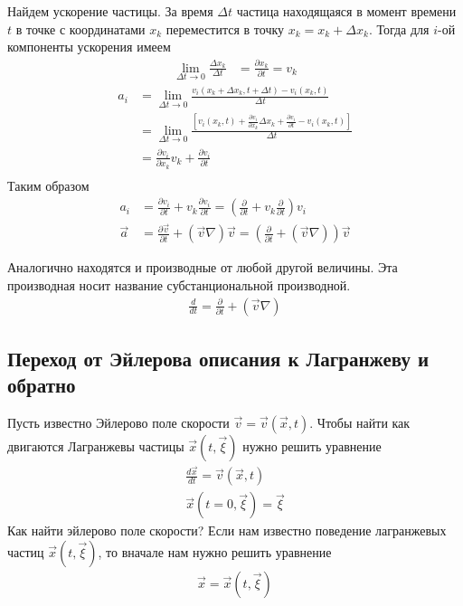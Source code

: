 Найдем ускорение частицы. За время $ \Delta t $ частица находящаяся в момент времени $t$ в точке с координатами $ x_{k} $ переместится в точку $ x_{k}=x_{k}+\Delta x_{k} $. Тогда для $i$-ой компоненты ускорения имеем
\begin{align*} 
\lim _{\Delta t \rightarrow 0} \frac{\Delta x_{k}}{\Delta t} &=\frac{\partial x_{k}}{\partial t}=v_{k} 
\end{align*}
\begin{align*}
a_{i} &=\lim _{\Delta t \rightarrow 0} \frac{v_{i}\left(x_{k}+\Delta x_{k}, t+\Delta t\right)-v_{i}\left(x_{k}, t\right)}{\Delta t} \\
&=\lim _{\Delta t \rightarrow 0}\frac{\left[v_{i}\left(x_{k}, t\right)+\frac{\partial v_{i}}{\partial x_{k}} \Delta x_{k}+\frac{\partial v_{i}}{\partial t}-v_{i}\left(x_{k}, t\right)\right]}{\Delta t} \\
&=\frac{\partial v_{i}}{\partial x_{k}} v_{k}+\frac{\partial v_{i}}{\partial t} \\
\end{align*}
Таким образом 
\begin{align*} 
a_{i} &=\frac{\partial v_{i}}{\partial t}+v_{k} \frac{\partial v_{i}}{\partial t}=\left(\frac{\partial}{\partial t}+v_{k} \frac{\partial}{\partial t}\right) v_{i} \\
\vec{a} &=\frac{\partial \vec{v}}{\partial t}+(\vec{v} \nabla) \vec{v}=\left(\frac{\partial}{\partial t}+(\vec{v} \nabla)\right) \vec{v}
\end{align*}

Аналогично находятся и производные от любой другой величины. Эта производная носит название субстанциональной производной.
\begin{align*} 
\frac{d}{d t}=\frac{\partial}{\partial t}+(\vec{v} \nabla)
\end{align*}
\subsection{Переход от Эйлерова описания к Лагранжеву и обратно}
Пусть известно Эйлерово поле скорости $ \vec{v}=\vec{v}(\vec{x}, t) $. Чтобы найти как двигаются Лагранжевы частицы $ \vec{x}(t, \vec{\xi}) $ нужно решить уравнение
\begin{align*} 
\frac{d \vec{x}}{d t}=\vec{v}(\vec{x}, t) \\
\vec{x}(t=0, \vec{\xi})=\vec{\xi}
\end{align*}
Как найти эйлерово поле скорости? Если нам известно поведение лагранжевых частиц $ \vec{x}(t, \vec{\xi}) $, то вначале нам нужно решить уравнение 
\begin{align*} 
\vec{x}=\vec{x}(t, \vec{\xi})
\end{align*}

